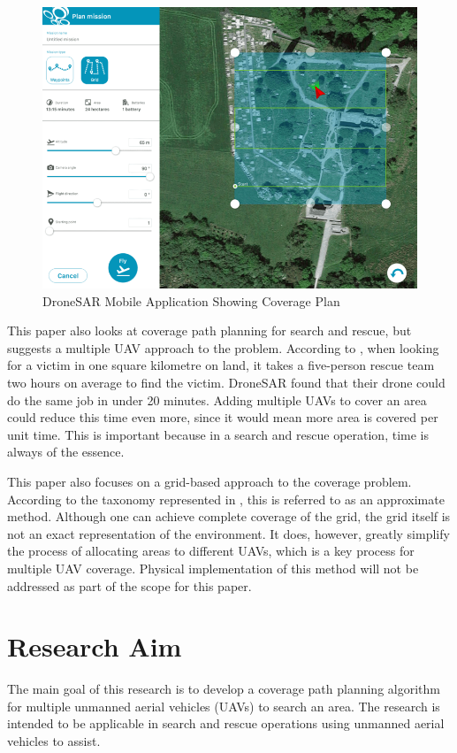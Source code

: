 \begin{figure}[h]
	\centering
	\includegraphics[scale=0.3]{figs/content_DroneSAR_screenshot_3.png}
	\caption{DroneSAR Mobile Application Showing Coverage Plan\cite{DroneSAR01}}
	\label{fig:DroneSAR}
\end{figure}

This paper also looks at coverage path planning for search and rescue, but suggests a multiple UAV approach to the problem. According to \cite{DroneSAR01}, when looking for a victim in one square kilometre on land, it takes a five-person rescue team two hours on average to find the victim. DroneSAR found that their drone could do the same job in under 20 minutes. Adding multiple UAVs to cover an area could reduce this time even more, since it would mean more area is covered per unit time. This is important because in a search and rescue operation, time is always of the essence.

This paper also focuses on a grid-based approach to the coverage problem. According to the taxonomy represented in \cite{Choset2001}, this is referred to as an approximate method. Although one can achieve complete coverage of the grid, the grid itself is not an exact representation of the environment. It does, however, greatly simplify the process of allocating areas to different UAVs, which is a key process for multiple UAV coverage. Physical implementation of this method will not be addressed as part of the scope for this paper.

\section{Research Aim}
\label{sec:intro_researchAim}
The main goal of this research is to develop a coverage path planning algorithm for multiple unmanned aerial vehicles (UAVs) to search an area. The research is intended to be applicable in search and rescue operations using unmanned aerial vehicles to assist.


